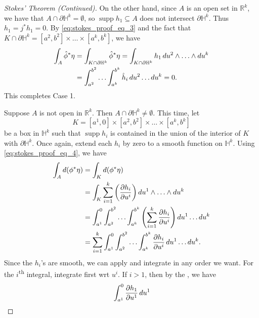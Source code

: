 \documentclass[notoc,notitlepage]{tufte-book}
\DeclareMathOperator{\supp}{supp}
\begin{document}
\begin{proof}[Stokes' Theorem (Continued)]
  On the other hand, since $A$ is an open set in $\mathbb{R}^k$, we have that $A
  \cap \partial \mathbb{H}^k = \emptyset$, so $\supp h_1 \subseteq A$ does not
  intersect $\partial \mathbb{H}^k$. Thus $h_1 = j^* h_1 = 0$. By
  \cref{eq:stokes_proof_eq_3} and the fact that $K \cap \partial \mathbb{H}^k =
  [a^2, b^2] \times \hdots \times [a^k, b^k]$, we have
  \begin{align*}
    \int_{A} \hat{\phi}^* \eta
    &= \int_{K \cap \partial \mathbb{H}^k} \hat{\phi}^* \eta = \int_{K \cap
    \partial \mathbb{H}^k} h_1 \mathop{}\!d{u^2} \land \hdots \land \mathop{}\!d{u^k} \\
    &= \int_{a^2}^{b^2} \hdots \int_{a^k}^{b^k} \hat{h}_i \mathop{}\!d{u^2} \hdots
    \mathop{}\!d{u^k} = 0.
  \end{align*}
  This completes Case 1.

  \noindent
   Suppose $A$ is not open in $\mathbb{R}^k$. Then $A \cap
  \partial \mathbb{H}^k \neq \emptyset$. This time, let
  \begin{equation*}
    K = [a^1, 0] \times [a^2, b^2] \times \hdots \times [a^k, b^k]
  \end{equation*}
  be a box in $\mathbb{H}^k$ such that $\supp h_i$ is contained in the union of
  the interior of $K$ with $\partial \mathbb{H}^k$. Once again, extend each
  $h_i$ by zero to a smooth function on $\mathbb{H}^k$. Using
  \cref{eq:stokes_proof_eq_4}, we have
  \begin{align*}
    \int_{A} \dif{(\phi^* \eta)}
    &= \int_{K} \dif{(\phi^* \eta)} \\
    &= \int_{K} \sum_{i=1}^{k} \left( \frac{\partial h_i}{\partial u^i} \right)
    \dif{u^1} \land \hdots \land \dif{u^k} \\
    &= \int_{a^1}^{0} \int_{a^2}^{b^2} \hdots \int_{a^k}^{b^k} \left(
    \sum_{i=1}^{k} \frac{\partial h_i}{\partial u^i} \right) \dif{u^1} \hdots
    \dif{u^k} \\
    &= \sum_{i=1}^{k} \int_{a^1}^{0} \int_{a^2}^{b^2} \hdots \int_{a^k}^{b^k}
    \frac{\partial h_i}{\partial u^i} \dif{u^1} \hdots \dif{u^k}.
  \end{align*}
  Since the $h_i$'s are smooth, we can apply  and
  integrate in any order we want. For the $i$\textsuperscript{th} integral,
  integrate first wrt $u^i$. If $i > 1$, then by the , we have
  \begin{align*}
    &\int_{a^1}^{0} \frac{\partial h_1}{\partial u^1} \dif{u^1} \\

\end{align*}
\end{proof}
\end{document}
